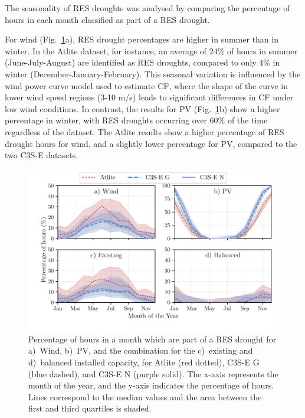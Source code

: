 \documentclass[a4paper, 11p1t]{article}
\begin{document}
The seasonality of RES droughts was analysed by comparing the percentage of hours in each month classified as part of a RES drought. 

For wind (Fig.~\ref{fig:res_droughts_seasonality}a), RES drought percentages are higher in summer than in winter. In the Atlite dataset, for instance, an average of 24\% of hours in summer (June-July-August) are identified as RES droughts, compared to only 4\% in winter (December-January-February). This seasonal variation is influenced by the wind power curve model used to estimate CF, where the shape of the curve in lower wind speed regions (3-10 m/s) leads to significant differences in CF under low wind conditions. In contrast, the results for PV (Fig.~\ref{fig:res_droughts_seasonality}b) show a higher percentage in winter, with RES droughts occurring over 60\% of the time regardless of the dataset. The Atlite results show a higher percentage of RES drought hours for wind, and a slightly lower percentage for PV, compared to the two C3S-E datasets. 

\begin{figure}[!ht]
	\centering
	\includegraphics{droughts_seasonality.pdf}
	\caption{Percentage of hours in a month which are part of a RES drought for a)~Wind, b)~PV, and the combination for the c)~existing and d)~balanced installed capacity, for Atlite (red dotted), C3S-E G (blue dashed), and C3S-E N (purple solid). The x-axis represents the month of the year, and the y-axis indicates the percentage of hours. Lines correspond to the median values and the area between the first and third quartiles is shaded.}
	\label{fig:res_droughts_seasonality}
\end{figure}
\end{document}
